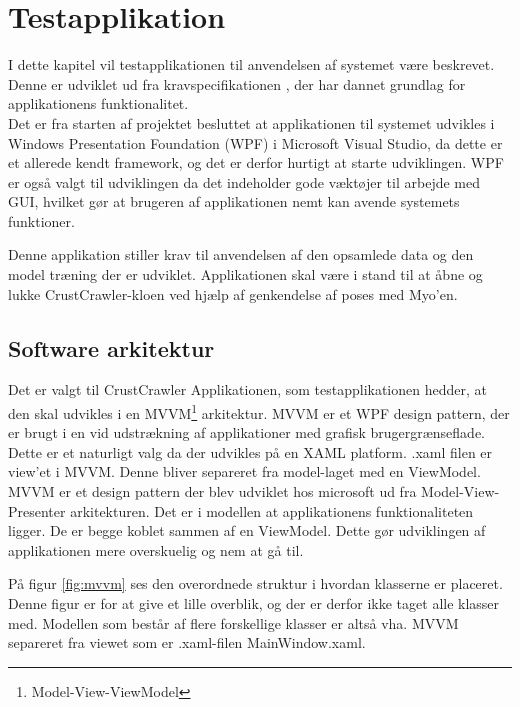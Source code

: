 \thispagestyle{fancy}
\chapter{Testapplikation}
I dette kapitel vil testapplikationen til anvendelsen af systemet være beskrevet. Denne er udviklet ud fra kravspecifikationen \citep{RefWorks:8}, der har dannet grundlag for applikationens funktionalitet. \\
Det er fra starten af projektet besluttet at applikationen til systemet udvikles i Windows Presentation Foundation (WPF) i Microsoft Visual Studio, da dette er et allerede kendt framework, og det er derfor hurtigt at starte udviklingen. WPF er også valgt til udviklingen da det indeholder gode væktøjer til arbejde med GUI, hvilket gør at brugeren af applikationen nemt kan avende systemets funktioner.

Denne applikation stiller krav til anvendelsen af den opsamlede data og den model træning der er udviklet. Applikationen skal være i stand til at åbne og lukke CrustCrawler-kloen ved hjælp af genkendelse af poses med Myo'en.

\section{Software arkitektur}
Det er valgt til CrustCrawler Applikationen, som testapplikationen hedder, at den skal udvikles i en MVVM\footnote{Model-View-ViewModel} arkitektur\citep{RefWorks:14}. MVVM er et WPF design pattern, der er brugt i en vid udstrækning af applikationer med grafisk brugergrænseflade. Dette er et naturligt valg da der udvikles på en XAML platform. .xaml filen er view'et i MVVM. Denne bliver separeret fra model-laget med en ViewModel. MVVM er et design pattern der blev udviklet hos microsoft ud fra Model-View-Presenter arkitekturen\citep{mvp}. Det er i modellen at applikationens funktionaliteten ligger. De er begge koblet sammen af en ViewModel. Dette gør udviklingen af applikationen mere overskuelig og nem at gå til.


På figur \ref{fig:mvvm} ses den overordnede struktur i hvordan klasserne er placeret. Denne figur er for at give et lille overblik, og der er derfor ikke taget alle klasser med. Modellen som består af flere forskellige klasser er altså vha. MVVM separeret fra viewet som er .xaml-filen MainWindow.xaml.

